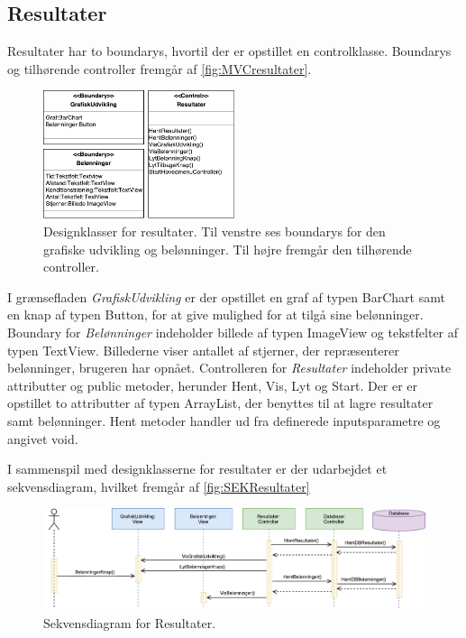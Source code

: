 \subsection*{Resultater}
Resultater har to boundarys, hvortil der er opstillet en controlklasse. Boundarys og tilhørende controller fremgår af \autoref{fig:MVCresultater}. 

\begin{figure} [H]
\centering
\includegraphics[width=0.5\textwidth]{figures/MVC/MVCResultater}
\caption{Designklasser for resultater. Til venstre ses boundarys for den grafiske udvikling og belønninger. Til højre fremgår den tilhørende controller.}
\label{fig:MVCresultater}
\end{figure}

\noindent
I grænsefladen \textit{GrafiskUdvikling} er der opstillet en graf af typen BarChart samt en knap af typen Button, for at give mulighed for at tilgå sine belønninger. Boundary for \textit{Belønninger} indeholder billede af typen ImageView og tekstfelter af typen TextView. Billederne viser antallet af stjerner, der repræsenterer belønninger, brugeren har opnået.
Controlleren for \textit{Resultater} indeholder private attributter og public metoder, herunder Hent, Vis, Lyt og Start. Der er er opstillet to attributter af typen ArrayList, der benyttes til at lagre resultater samt belønninger. Hent metoder handler ud fra definerede inputsparametre og angivet void. 

I sammenspil med designklasserne for resultater er der udarbejdet et sekvensdiagram, hvilket fremgår af \autoref{fig:SEKResultater}

\begin{figure} [H]
\centering
\includegraphics[width=1\textwidth]{figures/Sek/SEKResultater}
\caption{Sekvensdiagram for Resultater.}
\label{fig:SEKResultater}
\end{figure} 

